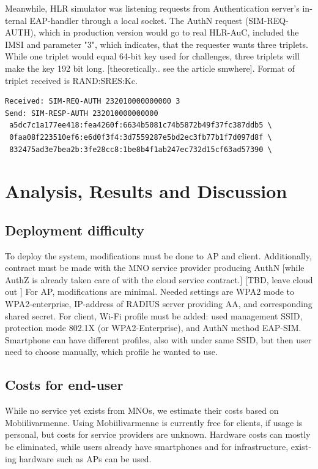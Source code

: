 \documentclass[12pt,a4paper,english]{tutthesis}
\begin{document}
\begin{otherlanguage}{english}
Meanwhile, HLR simulator was listening requests from Authentication
server's internal EAP-handler through a local socket.
The AuthN request (SIM-REQ-AUTH), which in production version would go
to real HLR-AuC, included the IMSI and parameter
"3", which indicates, that the requester wants three triplets. 
While one triplet would equal 64-bit key used for challenges, three
triplets will make the key 192 bit long. [theoretically.. see the
article smwhere].  Format of triplet received is RAND:SRES:Kc.

\scriptsize
\begin{verbatim}
Received: SIM-REQ-AUTH 232010000000000 3
Send: SIM-RESP-AUTH 232010000000000 
 a5dc7c1a177ee418:fea4260f:6634b5081c74b5872b49f37fc387ddb5 \
 0faa08f223510ef6:e6d0f3f4:3d7559287e5bd2ec3fb77b1f7d097d8f \
 832475ad3e7bea2b:3fe28cc8:1be8b4f1ab247ec732d15cf63ad57390 \
\end{verbatim}
\normalsize


\chapter{Analysis, Results and Discussion}
\label{sec-6}



\section{Deployment difficulty}
\label{sec-6-1}

To deploy the system, modifications must be done to AP and client.
Additionally, contract must be made with the MNO service
provider producing AuthN [while AuthZ is already taken care of with
the cloud service contract.]  [TBD, leave cloud out ]
For AP, modifications are minimal. Needed settings are
WPA2 mode to WPA2-enterprise, IP-address of RADIUS server providing 
AA, and corresponding shared secret.
For client, Wi-Fi profile must be added: used management SSID,
protection mode 802.1X (or WPA2-Enterprise), and AuthN method EAP-SIM.
Smartphone can have different profiles, also with under same SSID, but
then user need to choose manually, which profile he wanted to use.

\section{Costs for end-user}
\label{sec-6-2}
While no service yet exists from MNOs, we estimate their costs based
on Mobiilivarmenne. Using Mobiilivarmenne is currently free for
clients, if usage is personal, but costs for service providers are
unknown.  Hardware costs can mostly be eliminated, while users already
have smartphones and for infrastructure, existing hardware such as APs
can be used.


\end{otherlanguage}
\end{document}
